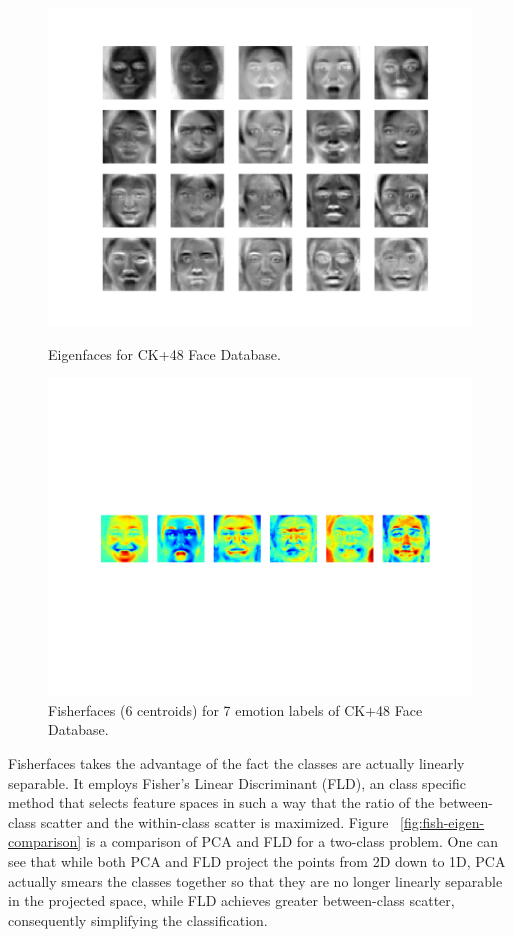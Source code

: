 \documentclass[10pt,twocolumn,letterpaper]{article}
\begin{document}
\begin{figure}[t]
\begin{center}
   \includegraphics[width=0.9\linewidth]{Feature Extraction Images/eigenfaces.png}
   \caption{Eigenfaces for CK+48 Face Database.}
\end{center}
\begin{center}
    \includegraphics[width=0.9\linewidth]{Feature Extraction Images/fisherfaces.png}
   \caption{Fisherfaces (6 centroids) for 7 emotion labels of CK+48 Face Database.}
 \end{center}
\label{fig:long}
\label{fig:onecol}
\end{figure}

Fisherfaces takes the advantage of the fact the classes are actually linearly separable. It employs Fisher's Linear Discriminant (FLD), an class specific method that selects feature spaces in such a way that the ratio of the between-class scatter and the within-class scatter is maximized. Figure ~\ref{fig:fish-eigen-comparison} is a comparison of PCA and FLD for a two-class problem. One can see that while both PCA and FLD project the points from 2D down to 1D, PCA actually smears the classes together so that they are no longer linearly separable in the projected space, while FLD achieves greater between-class scatter, consequently simplifying the classification. \cite{Article06}
\end{document}
